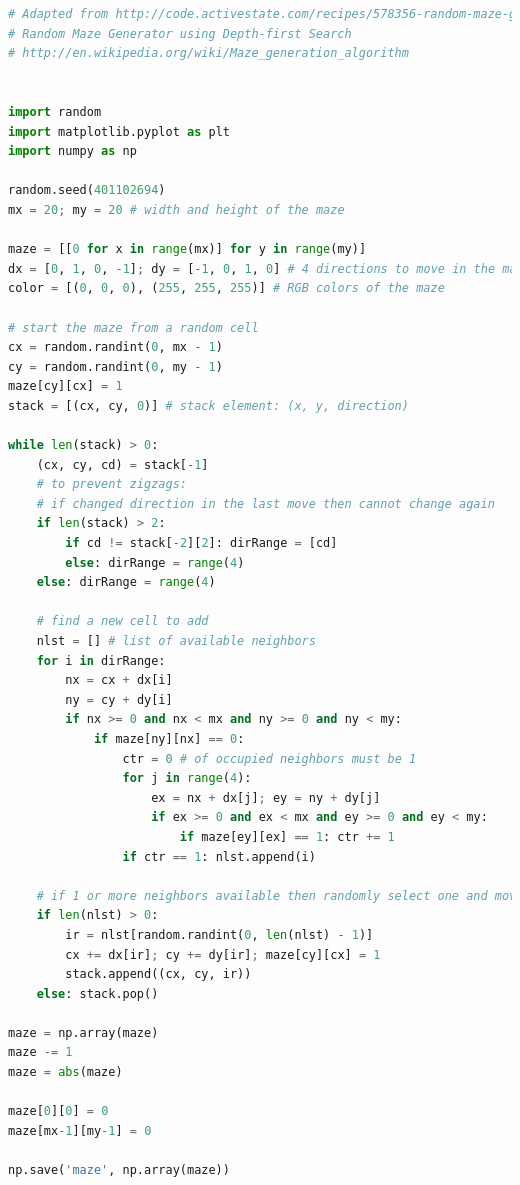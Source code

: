 \documentclass[11pt]{article}
\begin{document}
\begin{lstlisting}[language=Python]
# Adapted from http://code.activestate.com/recipes/578356-random-maze-generator/
# Random Maze Generator using Depth-first Search
# http://en.wikipedia.org/wiki/Maze_generation_algorithm


import random
import matplotlib.pyplot as plt
import numpy as np

random.seed(401102694)
mx = 20; my = 20 # width and height of the maze

maze = [[0 for x in range(mx)] for y in range(my)]
dx = [0, 1, 0, -1]; dy = [-1, 0, 1, 0] # 4 directions to move in the maze
color = [(0, 0, 0), (255, 255, 255)] # RGB colors of the maze

# start the maze from a random cell
cx = random.randint(0, mx - 1)
cy = random.randint(0, my - 1)
maze[cy][cx] = 1
stack = [(cx, cy, 0)] # stack element: (x, y, direction)

while len(stack) > 0:
    (cx, cy, cd) = stack[-1]
    # to prevent zigzags:
    # if changed direction in the last move then cannot change again
    if len(stack) > 2:
        if cd != stack[-2][2]: dirRange = [cd]
        else: dirRange = range(4)
    else: dirRange = range(4)

    # find a new cell to add
    nlst = [] # list of available neighbors
    for i in dirRange:
        nx = cx + dx[i]
        ny = cy + dy[i]
        if nx >= 0 and nx < mx and ny >= 0 and ny < my:
            if maze[ny][nx] == 0:
                ctr = 0 # of occupied neighbors must be 1
                for j in range(4):
                    ex = nx + dx[j]; ey = ny + dy[j]
                    if ex >= 0 and ex < mx and ey >= 0 and ey < my:
                        if maze[ey][ex] == 1: ctr += 1
                if ctr == 1: nlst.append(i)

    # if 1 or more neighbors available then randomly select one and move
    if len(nlst) > 0:
        ir = nlst[random.randint(0, len(nlst) - 1)]
        cx += dx[ir]; cy += dy[ir]; maze[cy][cx] = 1
        stack.append((cx, cy, ir))
    else: stack.pop()

maze = np.array(maze)
maze -= 1
maze = abs(maze)
        
maze[0][0] = 0
maze[mx-1][my-1] = 0

np.save('maze', np.array(maze))
    
\end{lstlisting}
\end{document}
